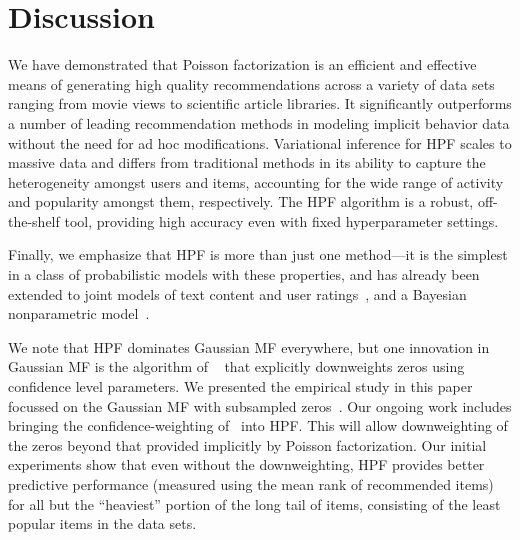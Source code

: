 \section{Discussion}
We have demonstrated that Poisson factorization is an efficient and
effective means of generating high quality recommendations across a
variety of data sets ranging from movie views to scientific article
libraries. It significantly outperforms a number of leading
recommendation methods in modeling implicit behavior data without the
need for ad hoc modifications. Variational inference for HPF scales to
massive data and differs from traditional methods in its ability to
capture the heterogeneity amongst users and items, accounting for the
wide range of activity and popularity amongst them, respectively. The
HPF algorithm is a robust, off-the-shelf tool, providing high accuracy
even with fixed hyperparameter settings.


Finally, we emphasize that HPF is more than just one method---it is
the simplest in a class of probabilistic models with these properties,
and has already been extended to joint models of text content and user
ratings~\cite{gopalan2014content}, and a Bayesian nonparametric
model~\cite{gopalan2014bayesian}. 

We note that HPF dominates Gaussian MF everywhere, but one innovation
in Gaussian MF is the algorithm of ~\cite{Hu:2008p9402} that
explicitly downweights zeros using confidence level parameters. We
presented the empirical study in this paper focussed on the Gaussian
MF with subsampled zeros~\cite{Koren:2009}. Our ongoing work includes
bringing the confidence-weighting of~\cite{Hu:2008p9402} into HPF.
This will allow downweighting of the zeros beyond that provided
implicitly by Poisson factorization. Our initial experiments show that
even without the downweighting, HPF provides better predictive
performance (measured using the mean rank of recommended items) for
all but the ``heaviest'' portion of the long tail of items, consisting
of the least popular items in the data sets.






